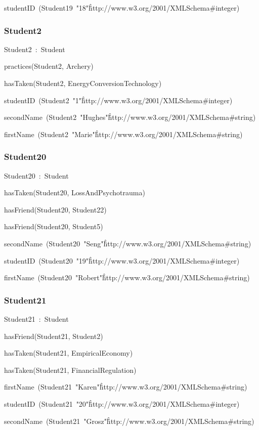 \documentclass{article}
\begin{document}
studentID~(Student19~"18"\^\^http://www.w3.org/2001/XMLSchema#integer)

\subsubsection*{Student2}

Student2~:~Student

practices(Student2, Archery)

hasTaken(Student2, EnergyConversionTechnology)

studentID~(Student2~"1"\^\^http://www.w3.org/2001/XMLSchema#integer)

secondName~(Student2~"Hughes"\^\^http://www.w3.org/2001/XMLSchema#string)

firstName~(Student2~"Marie"\^\^http://www.w3.org/2001/XMLSchema#string)

\subsubsection*{Student20}

Student20~:~Student

hasTaken(Student20, LossAndPsychotrauma)

hasFriend(Student20, Student22)

hasFriend(Student20, Student5)

secondName~(Student20~"Seng"\^\^http://www.w3.org/2001/XMLSchema#string)

studentID~(Student20~"19"\^\^http://www.w3.org/2001/XMLSchema#integer)

firstName~(Student20~"Robert"\^\^http://www.w3.org/2001/XMLSchema#string)

\subsubsection*{Student21}

Student21~:~Student

hasFriend(Student21, Student2)

hasTaken(Student21, EmpiricalEconomy)

hasTaken(Student21, FinancialRegulation)

firstName~(Student21~"Karen"\^\^http://www.w3.org/2001/XMLSchema#string)

studentID~(Student21~"20"\^\^http://www.w3.org/2001/XMLSchema#integer)

secondName~(Student21~"Grosz"\^\^http://www.w3.org/2001/XMLSchema#string)
\end{document}
